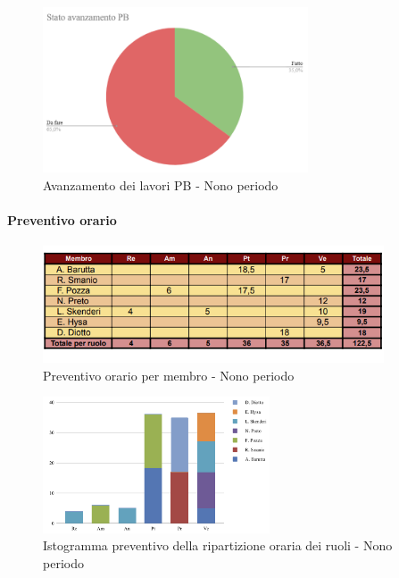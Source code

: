 \begin{figure}[H]
    \centering
    \begin{minipage}[b]{0.70\textwidth}
        \centering
        \includegraphics[width=0.7\textwidth]{../Images/torta9.png}
        \caption{Avanzamento dei lavori PB - Nono periodo}
        \label{fig:Avanzamento_PB_9}
    \end{minipage}
\end{figure}

\paragraph{Preventivo orario}

\begin{figure}[H] 
    \centering
    \includegraphics[width=0.9\textwidth]{../Images/tabPrev9.png}
    \caption{Preventivo orario per membro - Nono periodo}
    \label{fig:Preventivo_orario_9}
\end{figure}

\begin{figure}[H]
    \centering
    \includegraphics[width=0.6\textwidth]{../Images/graficoConsPrev9.png}
    \caption{Istogramma preventivo della ripartizione oraria dei ruoli - Nono periodo}
    \label{fig:Preventivo_ripartizione_oraria_9}
\end{figure}

